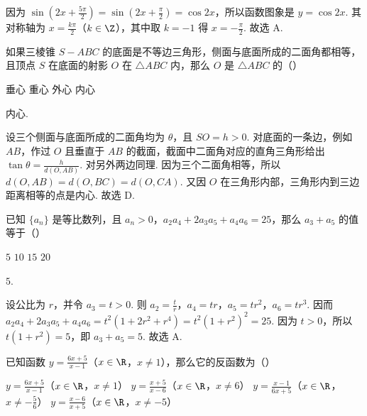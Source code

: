 \begin{solution}
因为 \(\sin\left(2x+\frac{5\pi}{2}\right)=\sin\left(2x+\frac{\pi}{2}\right)=\cos2x\)，所以函数图象是 \(y=\cos2x\). 其对称轴为 \(x=\frac{k\pi}{2}\)（\(k\in\Z\)），其中取 \(k=-1\) 得 \(x=-\frac{\pi}{2}\). 故选 A.
\end{solution}

\begin{problem}
如果三棱锥 \(S-ABC\) 的底面是不等边三角形，侧面与底面所成的二面角都相等，且顶点 \(S\) 在底面的射影 \(O\) 在 \(\triangle ABC\) 内，那么 \(O\) 是 \(\triangle ABC\) 的（\quad）

\choices
    {垂心}
    {重心}
    {外心}
    {内心}
\end{problem}

\begin{answer}
内心.
\end{answer}

\begin{solution}
设三个侧面与底面所成的二面角均为 \(\theta\)，且 \(SO=h>0\). 对底面的一条边，例如 \(AB\)，作过 \(O\) 且垂直于 \(AB\) 的截面，截面中二面角对应的直角三角形给出 \(\tan\theta=\frac{h}{d(O,AB)}\). 对另外两边同理. 因为三个二面角相等，所以 \(d(O,AB)=d(O,BC)=d(O,CA)\). 又因 \(O\) 在三角形内部，三角形内到三边距离相等的点是内心. 故选 D.
\end{solution}

\begin{problem}
已知 \(\{a_{n}\}\) 是等比数列，且 \(a_{n}>0\)，\(a_{2}a_{4}+2a_{3}a_{5}+a_{4}a_{6}=25\)，那么 \(a_{3}+a_{5}\) 的值等于（\quad）

\choices
    {\(5\)}
    {\(10\)}
    {\(15\)}
    {\(20\)}
\end{problem}

\begin{answer}
\(5\).
\end{answer}

\begin{solution}
设公比为 \(r\)，并令 \(a_3=t>0\). 则 \(a_2=\frac{t}{r}\)，\(a_4=tr\)，\(a_5=tr^2\)，\(a_6=tr^3\). 因而
\(a_2a_4+2a_3a_5+a_4a_6=t^2(1+2r^2+r^4)=t^2(1+r^2)^2=25\).
因为 \(t>0\)，所以 \(t(1+r^2)=5\)，即 \(a_3+a_5=5\). 故选 A.
\end{solution}

\begin{problem}
已知函数 \(y = \frac{6x + 5}{x - 1}\)（\(x \in \R\)，\(x \neq 1\)），那么它的反函数为（\quad）

\choices
    {\(y = \frac{6x + 5}{x - 1}\)（\(x \in \R\)，\(x \neq 1\)）}
    {\(y = \frac{x + 5}{x - 6}\)（\(x \in \R\)，\(x \neq 6\)）}
    {\(y = \frac{x - 1}{6x + 5}\)（\(x \in \R\)，\(x \neq -\frac{5}{6}\)）}
    {\(y = \frac{x - 6}{x + 5}\)（\(x \in \R\)，\(x \neq -5\)）}
\end{problem}

